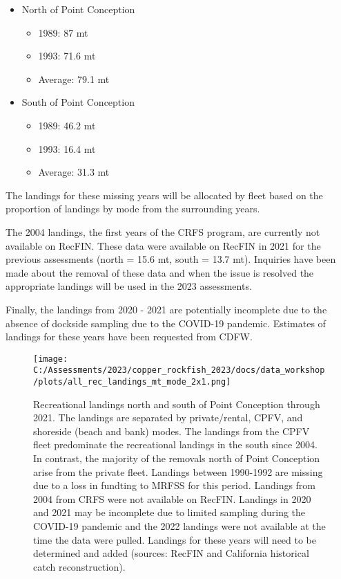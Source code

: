 \documentclass[
]{article}
\providecommand{\tightlist}{%
  \setlength{\itemsep}{0pt}\setlength{\parskip}{0pt}}
\begin{document}
\begin{itemize}
\tightlist
\item
  North of Point Conception

  \begin{itemize}
  \tightlist
  \item
    1989: 87 mt
  \item
    1993: 71.6 mt
  \item
    Average: 79.1 mt
  \end{itemize}
\item
  South of Point Conception

  \begin{itemize}
  \tightlist
  \item
    1989: 46.2 mt
  \item
    1993: 16.4 mt
  \item
    Average: 31.3 mt
  \end{itemize}
\end{itemize}

The landings for these missing years will be allocated by fleet based on
the proportion of landings by mode from the surrounding years.

The 2004 landings, the first years of the CRFS program, are currently
not available on RecFIN. These data were available on RecFIN in 2021 for
the previous assessments (north = 15.6 mt, south = 13.7 mt). Inquiries
have been made about the removal of these data and when the issue is
resolved the appropriate landings will be used in the 2023 assessments.

Finally, the landings from 2020 - 2021 are potentially incomplete due to
the absence of dockside sampling due to the COVID-19 pandemic. Estimates
of landings for these years have been requested from CDFW.

\begin{figure}
\centering
\texttt{[image: C:/Assessments/2023/copper\_rockfish\_2023/docs/data\_workshop/plots/all\_rec\_landings\_mt\_mode\_2x1.png]}
\caption{Recreational landings north and south of Point Conception
through 2021. The landings are separated by private/rental, CPFV, and
shoreside (beach and bank) modes. The landings from the CPFV fleet
predominate the recreational landings in the south since 2004. In
contrast, the majority of the removals north of Point Conception arise
from the private fleet. Landings between 1990-1992 are missing due to a
loss in fundting to MRFSS for this period. Landings from 2004 from CRFS
were not available on RecFIN. Landings in 2020 and 2021 may be
incomplete due to limited sampling during the COVID-19 pandemic and the
2022 landings were not available at the time the data were pulled.
Landings for these years will need to be determined and added (sources:
RecFIN and California historical catch
reconstruction).\label{fig:com-landings}}
\end{figure}
\end{document}
